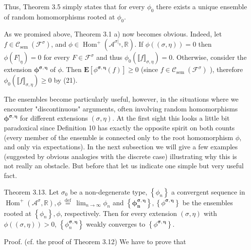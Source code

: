 \documentclass[10pt]{article}
\begin{document}
Thus, Theorem 3.5 simply states that for every $\phi_{0}$ there exists a unique ensemble of random homomorphisms rooted at $\phi_{0}$.

As we promised above, Theorem 3.1 a) now becomes obvious. Indeed, let $f \in \mathcal{C}_{\text {sem }}\left(\mathcal{F}^{\sigma}\right)$, and $\phi \in \operatorname{Hom}^{+}\left(\mathcal{A}^{\left.\sigma\right|_{\eta}}, \mathbb{R}\right)$. If $\phi((\sigma, \eta))=0$ then $\phi\left(\left.F\right|_{\eta}\right)=0$ for every $F \in \mathcal{F}^{\sigma}$ and thus $\phi_{0}\left(\llbracket f \rrbracket_{\sigma, \eta}\right)=0$. Otherwise, consider the extension $\boldsymbol{\phi}^{\boldsymbol{\sigma}, \boldsymbol{\eta}}$ of $\phi$. Then $\mathbf{E}\left[\phi^{\boldsymbol{\sigma}, \boldsymbol{\eta}}(f)\right] \geq 0$ (since $f \in \mathcal{C}_{\text {sem }}\left(\mathcal{F}^{\sigma}\right)$ ), therefore $\phi_{0}\left(\llbracket f \rrbracket_{\sigma, \eta}\right) \geq 0$ by (21).

The ensembles become particularly useful, however, in the situations where we encounter "discontinuous" arguments, often involving random homomorphisms $\boldsymbol{\phi}^{\boldsymbol{\sigma}, \boldsymbol{\eta}}$ for different extensions $(\sigma, \eta)$. At the first sight this looks a little bit paradoxical since Definition 10 has exactly the opposite spirit on both counts (every member of the ensemble is connected only to the root homomorphism $\phi$, and only via expectations). In the next subsection we will give a few examples (suggested by obvious analogies with the discrete case) illustrating why this is\\
not really an obstacle. But before that let us indicate one simple but very useful fact.

Theorem 3.13. Let $\sigma_{0}$ be a non-degenerate type, $\left\{\phi_{n}\right\}$ a convergent sequence in $\operatorname{Hom}^{+}\left(\mathcal{A}^{\sigma}, \mathbb{R}\right), \phi \stackrel{\text { def }}{=} \lim _{n \rightarrow \infty} \phi_{n}$ and $\left\{\boldsymbol{\phi}_{\boldsymbol{n}}^{\boldsymbol{\sigma}, \boldsymbol{\eta}}\right\},\left\{\phi^{\boldsymbol{\sigma}, \boldsymbol{\eta}}\right\}$ be the ensembles rooted at $\left\{\phi_{n}\right\}, \phi$, respectively. Then for every extension $(\sigma, \eta)$ with $\phi((\sigma, \eta))>0$, $\left\{\phi_{n}^{\boldsymbol{\sigma}, \boldsymbol{\eta}}\right\}$ weakly converges to $\left\{\phi^{\boldsymbol{\sigma}, \boldsymbol{\eta}}\right\}$.

Proof. (cf. the proof of Theorem 3.12) We have to prove that
\end{document}
